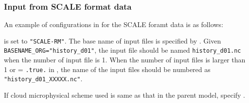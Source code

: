 \subsubsection{Input from SCALE format data} \label{sec:datainput_scale}

An example of configurations in  for the SCALE foramt data is as follows:


 is set to \verb|"SCALE-RM"|. 
The base name of input files is specified by .  
Given \verb|BASENAME_ORG="history_d01"|, the input file should be named \verb|history_d01.nc| when the number of input file is 1. 
When the number of input files is larger than 1 or  = \verb|.true.| in , 
the name of the input files should be numbered as \verb|"history_d01_XXXXX.nc"|. 

If cloud microphysical scheme used is same as that in the parent model, specify . 


